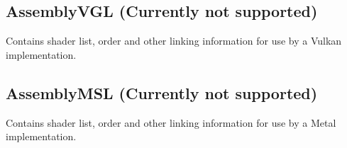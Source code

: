 \subsection{AssemblyVGL (Currently not supported)}
Contains shader list, order and other linking information for use by a Vulkan \cite{Vulkan} implementation.

\subsection{AssemblyMSL (Currently not supported)}
Contains shader list, order and other linking information for use by a Metal \cite{Metal} implementation.
